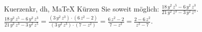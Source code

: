 \begin{MAufgabe}{Kuerzen}{kr, dh, MaTeX}
K\"urzen Sie soweit m\"oglich: $\frac{18\, y^2\, z^5 - 6\, y^2\, z^3}{21\, y^2\, z^3 - 3\, y^2\, z^5}$.\\ 
\ifLsg\MLoesung
\quad $\frac{18\, y^2\, z^5 - 6\, y^2\, z^3}{21\, y^2\, z^3 - 3\, y^2\, z^5}=\frac{(3\, y^2\, z^3)\cdot(6\, z^2 - 2)}{(3\, y^2\, z^3)\cdot(7 - z^2)}=\frac{6\, z^2 - 2}{7 - z^2}=\frac{2 - 6\, z^2}{z^2 - 7}$.\else\relax\fi
 \end{MAufgabe}